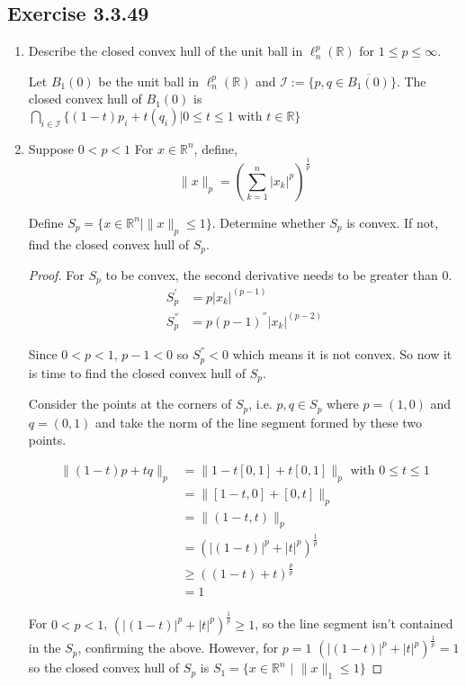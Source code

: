 \documentclass{tufte-book}
\theoremstyle{mytheoremstyle}
\theoremstyle{mylemstyle}
\theoremstyle{mydefstyle}
\begin{document}
\subsection{Exercise 3.3.49}
\begin{enumerate}
\item Describe the closed convex hull of the unit ball in $\ell_n^p(\mathbb{R})$ for $1 \leq p \leq \infty$.

Let $B_1(0)$ be the unit ball in $\ell_n^p(\mathbb{R})$ and $\mathcal{I} := \{p,q \in \overline{B_1(0)} \}$.  The closed convex hull of $B_1(0)$ is $\bigcap_{i \in \mathcal{I}} \{(1-t)p_i + t(q_i) | 0 \leq t \leq 1 \text{ with } t \in \mathbb{R} \}$ 

\item Suppose $0 < p < 1$ For $x \in \mathbb{R}^n$, define,
\[ \|x\|_p = \left( \sum_{k=1}^n |x_k|^p \right)^\frac{1}{p} \]

Define $S_p = \{x \in \mathbb{R}^n | \|x\|_p \leq 1 \}$.  Determine whether $S_p$ is convex.  If not, find the closed convex hull of $S_p$.

\begin{proof}

For $S_p$ to be convex, the second derivative needs to be greater than $0$.
\begin{align*}
S_p^{'} &= p|x_k|^{(p-1)}\\
S_p^{''} &= p(p-1)^{''}|x_k|^{(p-2)}
\end{align*}

Since $0< p < 1$, $p-1 < 0$ so $S_p^{''} < 0$ which means it is not convex.  So now it is time to find the closed convex hull of $S_p$.

Consider the points at the corners of $S_p$, i.e. $p,q \in S_p$ where $p=(1,0)$ and $q=(0,1)$ and take the norm of the line segment formed by these two points.

\begin{align*}
\|(1-t)p+tq\|_p &= \|1-t[0,1] + t[0,1]\|_p \text{ with } 0 \leq t \leq 1 \\
&= \|[1-t,0] + [0,t]\|_p\\
&= \|(1-t, t)\|_p \\
&= (|(1-t)|^p + |t|^p)^\frac{1}{p} \\
&\geq ((1-t) + t)^\frac{p}{p} \\
&= 1
\end{align*}

For $0<p<1$, $(|(1-t)|^p + |t|^p)^\frac{1}{p} \geq 1$, so the line segment isn't contained in the $S_p$, confirming the above.  However, for $p=1$ $(|(1-t)|^p + |t|^p)^\frac{1}{p} = 1$ so the closed convex hull of $S_p$ is $S_1 = \{x \in \mathbb{R}^n \text{ | } \|x\|_1 \leq 1 \}$

\end{proof}

\end{enumerate}
\end{document}
